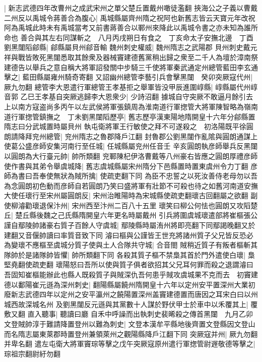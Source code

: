 |{
	新志武德四年改曹州之成武宋州之單父楚丘置戴州噉徒濫翻}
挾海公之子義以曹戴二州反以禹城令蔣善合為腹心|{
	禹城縣屬齊州隋之祝阿也新舊志皆云天寶元年改祝阿為禹城此時未有禹城當考又前書蔣善合以鄆州來降此以禹城令書之亦未知為誰所命也}
善合與其左右同謀斬之　八月丙戌朔日有食之　丁亥命太子安撫北邊　丁酉劉黑闥䧟鄃縣|{
	鄃縣屬貝州鄃音輸}
魏州刺史權威|{
	魏州隋志之武陽郡}
貝州刺史戴元祥與戰皆敗死黑闥悉取其餘衆及器械竇建德舊黨稍出歸之衆至二千人為壇於漳南祭建德告以舉兵之意自稱大將軍詔發關中步騎三千使將軍秦武通定州總管藍田李玄通擊之|{
	藍田縣屬雍州騎奇寄翻}
又詔幽州總管李藝引兵會擊黑闥　癸卯突厥寇代州|{
	厥九勿翻}
總管李大恩遣行軍總管王孝基拒之舉軍皆没甲辰進圍崞縣|{
	崞縣屬代州崞音郭}
乙巳王孝基自突厥逃歸李大恩衆少|{
	少詩沼翻}
據城自守突厥不敢逼月餘引去　上以南方寇盗尚多丙午以左武侯將軍張鎮周為淮南道行軍揔管大將軍陳智略為嶺南道行軍揔管鎮撫之　丁未劉黑闥䧟歷亭|{
	舊志歷亭漢東陽地隋開皇十六年分鄃縣置隋志曰分武城置時屬貝州}
執屯衛將軍王行敏使之拜不可遂殺之　初洛陽既平徐圓朗請降拜兖州總管|{
	兖州隋志之魯郡降戶江翻}
封魯郡公劉黑闥作亂隂與圓朗通謀上使葛公盛彦師安集河南行至任城|{
	任城縣屬兖州任音壬}
辛亥圓朗執彦師舉兵反黑闥以圓朗為大行臺元帥|{
	帥所類翻}
兖鄆陳杞伊洛曹戴等八州豪右皆應之圓朗厚禮彦師使作書與其弟令舉虞城降|{
	舊志虞城縣屬宋州隋分下邑縣置時置東虞州令力丁翻}
彦師為書曰吾奉使無狀為賊所擒|{
	使疏吏翻下同}
為臣不忠誓之以死汝善侍老母勿以吾為念圓朗初色動而彦師自若圓朗乃笑曰盛將軍有壯節不可殺也待之如舊河南道安撫大使任瓌行至宋州屬圓朗反|{
	宋州治睢陽時為宋城縣使疏吏翻瓌古回翻屬之欲翻}
副使柳濬勸瓌退保汴州|{
	宋州西至汴州二百八十五里}
瓌笑曰柳公何怯也圓朗又攻䧟楚丘|{
	楚丘縣後魏之己氏縣隋開皇六年更名時屬戴州}
引兵將圍虞城瓌遣部將崔樞張公謹自鄢陵帥諸豪右質子百餘人守虞城|{
	鄢陵縣時屬洧州將即亮翻下同鄢謁晚翻又於建翻又音偃帥讀曰率質音致下同}
濬曰樞與公謹皆王世充將諸州質子父兄皆反恐必為變瓌不應樞至虞城分質子使與土人合隊共守城|{
	合音閤}
賊稍近質子有叛者樞斬其隊帥於是諸隊帥皆懼|{
	帥所類翻下同}
各殺其質子樞不禁梟其首於門外遣使白瓌|{
	梟堅堯翻使疏吏翻}
瓌陽怒曰吾所以使與質子俱者欲招其父兄耳何罪而殺之退謂濬曰吾固知崔樞能辦此也縣人既殺質子與賊深仇吾何患乎賊攻虞城果不克而去　初竇建德以鄱陽崔元遜為深州刺史|{
	翻陽縣屬饒州隋開皇十六年以定州安平置深州大業初廢新志武德四年以定州之安平瀛州之饒陽置深州盖竇建德置而唐因之耳宋白曰以州城西故深城名州}
及劉黑闥反元遜與其黨數十人謀於野伏甲士於車中以禾覆其上|{
	覆敷又翻}
直入聽事|{
	聽讀曰廳}
自禾中呼譟而出執刺史裴晞殺之傳首黑闥　九月乙卯文登賊帥淳于難請降置登州以難為刺史|{
	文登本漢牟平縣地後齊置文登縣因文登山而名隋志屬東萊郡時置登州兼領萊州之觀陽縣降戶江翻下同}
突厥寇并州|{
	厥九勿翻并卑名翻}
遣左屯衛大將軍竇琮等擊之戊午突厥寇原州遣行軍揔管尉遟敬德等擊之|{
	琮祖宗翻尉紆勿翻}
